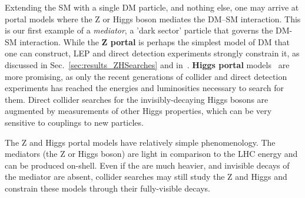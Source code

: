 
Extending the SM with a single DM particle, and nothing else, one may arrive at portal models where the Z or Higgs boson mediates the DM--SM interaction.%
This is our first example of a {\it mediator}, a 'dark sector' particle that governs the DM-SM interaction.
While the \textbf{Z portal} is perhaps the simplest model of DM that one can construct, LEP and direct detection experiments strongly constrain it, as discussed in Sec.~\ref{sec:results_ZHSearches} and in~\cite{Escudero:2016gzx}. 
\textbf{Higgs portal} models~\cite{Patt:2006fw,Djouadi:2011aa} are more promising, as only the recent generations of collider and direct detection experiments has reached the energies and luminosities necessary to search for them.%
Direct collider searches for the invisibly-decaying Higgs bosons are augmented by measurements of other Higgs properties, which can be very sensitive to couplings to new particles.

The Z and Higgs portal models have relatively simple phenomenology.
The mediators (the Z or Higgs boson) are light in comparison to the LHC energy and can be produced on-shell.
Even if the \IP are much heavier, and invisible decays of the mediator are absent, collider searches may still study the Z and Higgs and constrain these models through their fully-visible decays.




